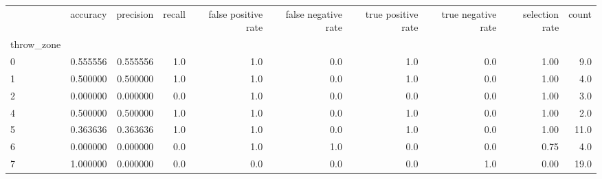 \begin{tabular}{lrrrrrrrrr}
\toprule
{} &  accuracy &  precision &  recall &  false positive rate &  false negative rate &  true positive rate &  true negative rate &  selection rate &  count \\
throw\_zone &           &            &         &                      &                      &                     &                     &                 &        \\
\midrule
0          &  0.555556 &   0.555556 &     1.0 &                  1.0 &                  0.0 &                 1.0 &                 0.0 &            1.00 &    9.0 \\
1          &  0.500000 &   0.500000 &     1.0 &                  1.0 &                  0.0 &                 1.0 &                 0.0 &            1.00 &    4.0 \\
2          &  0.000000 &   0.000000 &     0.0 &                  1.0 &                  0.0 &                 0.0 &                 0.0 &            1.00 &    3.0 \\
4          &  0.500000 &   0.500000 &     1.0 &                  1.0 &                  0.0 &                 1.0 &                 0.0 &            1.00 &    2.0 \\
5          &  0.363636 &   0.363636 &     1.0 &                  1.0 &                  0.0 &                 1.0 &                 0.0 &            1.00 &   11.0 \\
6          &  0.000000 &   0.000000 &     0.0 &                  1.0 &                  1.0 &                 0.0 &                 0.0 &            0.75 &    4.0 \\
7          &  1.000000 &   0.000000 &     0.0 &                  0.0 &                  0.0 &                 0.0 &                 1.0 &            0.00 &   19.0 \\
\bottomrule
\end{tabular}
